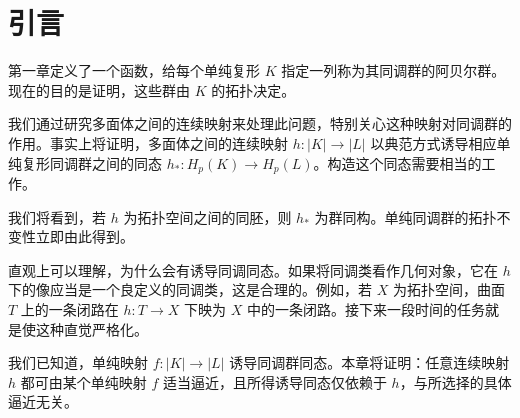 \section{引言}
第一章定义了一个函数，给每个单纯复形 $K$ 指定一列称为其同调群的阿贝尔群。现在的目的是证明，这些群由 $K$ 的拓扑决定。

我们通过研究多面体之间的连续映射来处理此问题，特别关心这种映射对同调群的作用。事实上将证明，多面体之间的连续映射 $h:|K|\to|L|$ 以典范方式诱导相应单纯复形同调群之间的同态 $h_*:H_p(K)\to H_p(L)$。构造这个同态需要相当的工作。

我们将看到，若 $h$ 为拓扑空间之间的同胚，则 $h_*$ 为群同构。单纯同调群的拓扑不变性立即由此得到。

直观上可以理解，为什么会有诱导同调同态。如果将同调类看作几何对象，它在 $h$ 下的像应当是一个良定义的同调类，这是合理的。例如，若 $X$ 为拓扑空间，曲面 $T$ 上的一条闭路在 $h:T\to X$ 下映为 $X$ 中的一条闭路。接下来一段时间的任务就是使这种直觉严格化。

我们已知道，单纯映射 $f:|K|\to|L|$ 诱导同调群同态。本章将证明：任意连续映射 $h$ 都可由某个单纯映射 $f$ 适当逼近，且所得诱导同态仅依赖于 $h$，与所选择的具体逼近无关。

